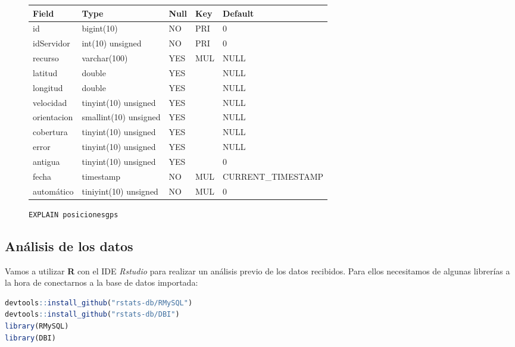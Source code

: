 \documentclass[a4paper, 12pt, spanish]{article}
\begin{document}
\begin{center}
	\begin{figure}[H]
	\begin{tabular}{|l|l|l|l|l|}
	\hline
	\hline
  		\cellcolor{LightCyan}Field & \cellcolor{LightCyan}Type & \cellcolor{LightCyan}Null & \cellcolor{LightCyan}Key & \cellcolor{LightCyan}Default \\
	\hline
	\hline
	id & bigint(10) & NO &  PRI & 0  \\
	idServidor & int(10) unsigned & NO & PRI & 0 \\
	recurso & varchar(100) & YES & MUL & NULL  \\
	latitud & double & YES & & NULL  \\
	longitud & double & YES & & NULL  \\
	velocidad & tinyint(10) unsigned & YES & & NULL  \\
	orientacion & smallint(10) unsigned & YES  & & NULL  \\
	cobertura & tinyint(10) unsigned & YES  & & NULL \\
	error & tinyint(10) unsigned  & YES & & NULL  \\
	antigua & tinyint(10) unsigned & YES  & & 0  \\
	fecha & timestamp & NO & MUL & CURRENT\_TIMESTAMP \\
	autom\'atico & tiniyint(10) unsigned & NO & MUL & 0  \\
	\hline
	\end{tabular}
	\caption{\texttt{EXPLAIN posicionesgps}}
	\end{figure}
\end{center}


\subsection{An\'alisis de los datos}

Vamos a utilizar \textbf{R} con el IDE \textit{Rstudio} para realizar un an\'alisis previo de los datos recibidos. Para ellos necesitamos de algunas librer\'ias a la hora de conectarnos a la base de datos importada:\\

\begin{lstlisting}[language=R, columns=fullflexible, basicstyle=\small, frame=tblr]
devtools::install_github("rstats-db/RMySQL")
devtools::install_github("rstats-db/DBI")
library(RMySQL)
library(DBI)
\end{lstlisting}

\smallskip
\end{document}
